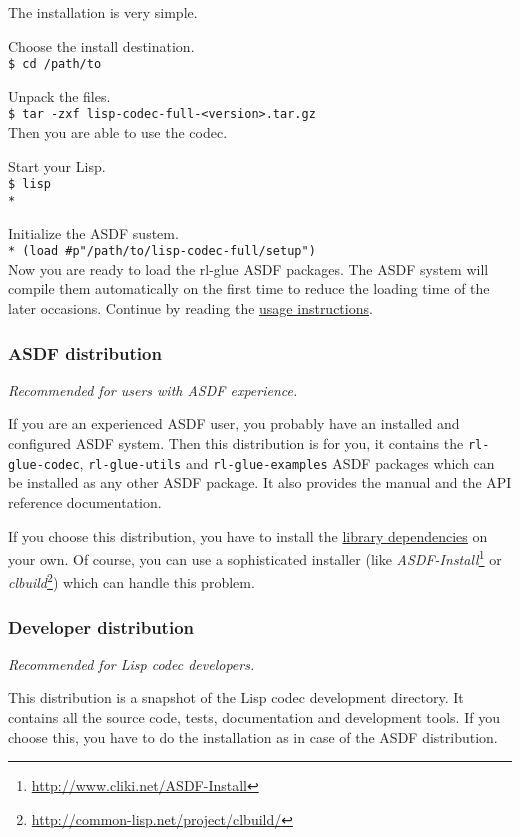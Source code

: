 \documentclass[11pt,a4paper,dvipdfm]{article}
\newcommand{\selfref}[1]{\href{#1}{#1}}
\newcommand{\footref}[2]{\textsl{#1}\footnote{\selfref{#2}}}
\newcommand{\prompttext}[1]{\texttt{#1}}
\newcommand{\shprompt}[1]{\prompttext{\$ #1}}
\newcommand{\lispprompt}[1]{\prompttext{* #1}}
\begin{document}
The installation is very simple.

Choose the install destination. \\
\shprompt{cd /path/to}

Unpack the files. \\
\shprompt{tar -zxf lisp-codec-full-<version>.tar.gz} \\

Then you are able to use the codec.

Start your Lisp. \\
\shprompt{lisp} \\
\lispprompt{}

Initialize the ASDF sustem. \\
\lispprompt{(load \#p"/path/to/lisp-codec-full/setup")} \\

Now you are ready to load the rl-glue ASDF packages. The ASDF system will
compile them automatically on the first time to reduce the loading time of
the later occasions. Continue by reading the
\hyperlink{usage}{usage instructions}.

\subsubsection{ASDF distribution}

\textsl{Recommended for users with ASDF experience.}

If you are an experienced ASDF user, you probably have an installed and
configured ASDF system. Then this distribution is for you, it contains
the \prompttext{rl-glue-codec}, \prompttext{rl-glue-utils} and
\prompttext{rl-glue-examples} ASDF packages which can be installed as any
other ASDF package. It also provides the manual and the API reference
documentation.

If you choose this distribution, you have to install the
\hyperlink{softreqs}{library dependencies} on your own. Of course,
you can use a sophisticated installer (like
\footref{ASDF-Install}{http://www.cliki.net/ASDF-Install}
or
\footref{clbuild}{http://common-lisp.net/project/clbuild/})
which can handle this problem.

\subsubsection{Developer distribution}

\textsl{Recommended for Lisp codec developers.}

This distribution is a snapshot of the Lisp codec development directory.
It contains all the source code, tests, documentation and development tools.
If you choose this, you have to do the installation as in case of the ASDF
distribution.
\end{document}
